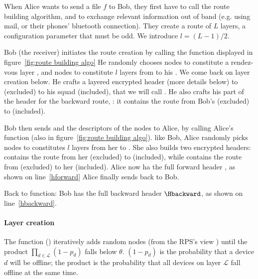 When Alice wants to send a file $f$ to Bob, they first have to call the route building algorithm, and to exchange relevant information out of band (e.g. using mail, or their phones' bluetooth connection).
They create a route of $L$ layers, a configuration parameter that must be odd. We introduce $l=(L-1)/2$.

Bob (the receiver) initiates the route creation by calling the \Recv function displayed in figure~\ref{fig:route building algo}
He randomly chooses nodes to constitute a rendez-vous layer \LRV, and nodes to constitute $l$ layers from \LRV to his \squad. 
We come back on layer creation below.
He crafts a layered encrypted header (more details below) to \LRV (excluded) to his squad (included), that we will call \Hrecforward.
He also crafts his part of the header for the backward route, \Hrecbackward: it contains the route from Bob's \squad (excluded) to \LRV (included).

Bob then sends \Hrecforward and the descriptors of the \LRV nodes to Alice, by calling Alice's \Send function (also in figure~\ref{fig:route building algo}).
like Bob, Alice randomly picks nodes to constitutes $l$ layers from her \squad to \LRV.
She also builds two encrypted headers: \Hsendforward contains the route from her \squad (excluded) to \LRV (included), while \Hsendbackward contains the route from \LRV (excluded) to her \squad (included).
Alice now ha the full forward header \Hforward, as shown on line~\ref{hforward}
Alice finally sends \Hsendbackward back to Bob.

Back to \Recv function: Bob has the full backward header $\Hbackward$, as shown on line~\ref{hbackward}.


\paragraph*{Layer creation}
The function \CreateOnionLayer() iteratively adds random nodes (from the RPS's view \view) until the product $\prod_{d\in \mathcal{L}} (1 - p_d)$ falls below $\theta$.
$(1 - p_d)$ is the probability that a device $d$ will be offline; the product is the probability that all devices on layer $\mathcal{L}$ fall offline at the same time.


\begin{table}[t]
\label{tab:parameters}
\end{table}


